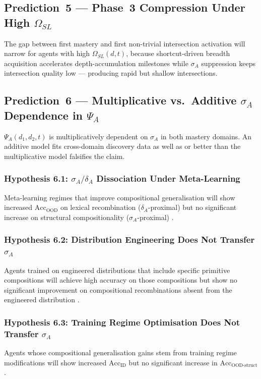 \subsection{Prediction~5 --- Phase~3 Compression Under High \texorpdfstring{$\Omega_{SL}$}{Omega\_SL}}
The gap between first mastery and first non-trivial intersection
activation will narrow for agents with high $\Omega_{SL}(d,t)$, because shortcut-driven breadth acquisition accelerates depth-accumulation milestones while $\sigma_A$ suppression keeps intersection quality low --- producing rapid but shallow intersections.

\subsection{Prediction~6 --- Multiplicative vs.\ Additive \texorpdfstring{$\sigma_A$}{sigma\_A}
Dependence in \texorpdfstring{$\Psi_A$}{Psi\_A}}
$\Psi_A(d_1,d_2,t)$ is multiplicatively dependent on $\sigma_A$ in both
mastery domains. An additive model fits cross-domain discovery data as
well as or better than the multiplicative model falsifies the claim.

\subsubsection*{Hypothesis 6.1: \texorpdfstring{$\sigma_A/\delta_A$}{sigma\_A/delta\_A} Dissociation Under Meta-Learning}
Meta-learning regimes that improve compositional generalisation will
show increased $\text{Acc}_{\text{OOD}}$ on lexical recombination
($\delta_A$-proximal) but no significant increase on structural
compositionality ($\sigma_A$-proximal)
\citep{lake2023humanlikesystematicgeneralization}.

\subsubsection*{Hypothesis 6.2: Distribution Engineering Does Not Transfer \texorpdfstring{$\sigma_A$}{sigma\_A}}
Agents trained on engineered distributions that include specific
primitive compositions will achieve high accuracy on those compositions
but show no significant improvement on compositional recombinations
absent from the engineered distribution
\citep{patel2022revisitingcompositionalgeneralization}.

\subsubsection*{Hypothesis 6.3: Training Regime Optimisation Does Not Transfer \texorpdfstring{$\sigma_A$}{sigma\_A}}
Agents whose compositional generalisation gains stem from training regime
modifications will show increased $\text{Acc}_{\text{ID}}$ but no
significant increase in $\text{Acc}_{\text{OOD-struct}}$.

